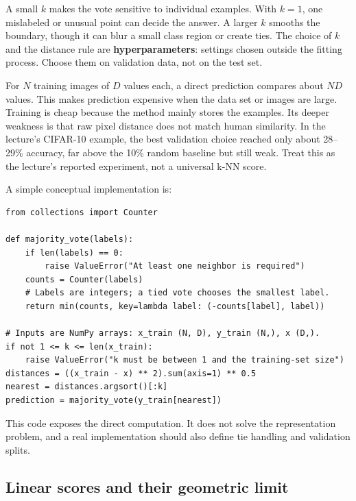 A small \(k\) makes the vote sensitive to individual examples. With \(k=1\), one mislabeled or unusual point can decide the answer. A larger \(k\) smooths the boundary, though it can blur a small class region or create ties. The choice of \(k\) and the distance rule are \textbf{hyperparameters}: settings chosen outside the fitting process. Choose them on validation data, not on the test set.

For \(N\) training images of \(D\) values each, a direct prediction compares about \(ND\) values. This makes prediction expensive when the data set or images are large. Training is cheap because the method mainly stores the examples. Its deeper weakness is that raw pixel distance does not match human similarity. In the lecture's CIFAR-10 example, the best validation choice reached only about 28--29\% accuracy, far above the 10\% random baseline but still weak. Treat this as the lecture's reported experiment, not a universal k-NN score.

A simple conceptual implementation is:

\begin{verbatim}
from collections import Counter

def majority_vote(labels):
    if len(labels) == 0:
        raise ValueError("At least one neighbor is required")
    counts = Counter(labels)
    # Labels are integers; a tied vote chooses the smallest label.
    return min(counts, key=lambda label: (-counts[label], label))

# Inputs are NumPy arrays: x_train (N, D), y_train (N,), x (D,).
if not 1 <= k <= len(x_train):
    raise ValueError("k must be between 1 and the training-set size")
distances = ((x_train - x) ** 2).sum(axis=1) ** 0.5
nearest = distances.argsort()[:k]
prediction = majority_vote(y_train[nearest])
\end{verbatim}

This code exposes the direct computation. It does not solve the representation problem, and a real implementation should also define tie handling and validation splits.

\subsection{Linear scores and their geometric limit}\label{04-visual-computing-ii-ch031-linear-scores-and-their-geometric-limit}

\hypertarget{04-visual-computing-ii-ch031-linear-scores-and-their-geometric-limit}{}

